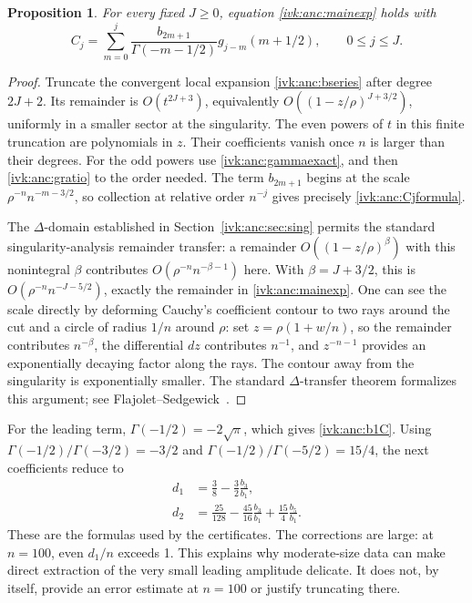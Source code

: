 \documentclass[11pt,letterpaper]{article}
\newtheorem{proposition}[theorem]{Proposition}
\theoremstyle{remark}\newtheorem{remark}[theorem]{Remark}
\begin{document}
\begin{proposition}\label{ivk:anc:prop:transfer}
For every fixed $J\ge0$, equation \eqref{ivk:anc:mainexp} holds with
\begin{equation}\label{ivk:anc:Cjformula}
 C_j=\sum_{m=0}^j
 \frac{b_{2m+1}}{\Gamma(-m-1/2)}
                  g_{j-m}(m+1/2),\qquad 0\le j\le J.
\end{equation}
\end{proposition}
\begin{proof}
Truncate the convergent local expansion \eqref{ivk:anc:bseries} after
degree $2J+2$. Its remainder is $O(t^{2J+3})$, equivalently
$O((1-z/\rho)^{J+3/2})$, uniformly in a smaller sector at the
singularity. The even powers of $t$ in this finite truncation
are polynomials in $z$. Their coefficients vanish once $n$ is
larger than their degrees. For the odd powers use
\eqref{ivk:anc:gammaexact}, and then \eqref{ivk:anc:gratio} to the order needed.
The term $b_{2m+1}$ begins at the scale
$\rho^{-n}n^{-m-3/2}$, so collection at relative order $n^{-j}$
gives precisely \eqref{ivk:anc:Cjformula}.

The $\Delta$-domain established in Section~\ref{ivk:anc:sec:sing} permits
the standard singularity-analysis remainder transfer: a remainder
$O((1-z/\rho)^\beta)$ with this nonintegral $\beta$ contributes
$O(\rho^{-n}n^{-\beta-1})$ here. With
$\beta=J+3/2$, this is
$O(\rho^{-n}n^{-J-5/2})$, exactly the remainder in
\eqref{ivk:anc:mainexp}. One can see the scale directly by deforming
Cauchy's coefficient contour to two rays around the cut and a
circle of radius $1/n$ around $\rho$: set
$z=\rho(1+w/n)$, so the remainder contributes $n^{-\beta}$,
the differential $dz$ contributes $n^{-1}$, and
$z^{-n-1}$ provides an exponentially decaying factor along the
rays. The contour away from the singularity is exponentially
smaller. The standard $\Delta$-transfer theorem formalizes this
argument; see Flajolet--Sedgewick~\cite[Chapter VI]{fs}.
\end{proof}

For the leading term,
$\Gamma(-1/2)=-2\sqrt\pi$, which gives \eqref{ivk:anc:b1C}.
Using $\Gamma(-1/2)/\Gamma(-3/2)=-3/2$ and
$\Gamma(-1/2)/\Gamma(-5/2)=15/4$, the next coefficients reduce to
\begin{align}
 d_1&=\frac38-\frac32\frac{b_3}{b_1},\label{ivk:anc:d1formula}\\
 d_2&=\frac{25}{128}-\frac{45}{16}\frac{b_3}{b_1}
                                  +\frac{15}{4}\frac{b_5}{b_1}.
                                                        \label{ivk:anc:d2formula}
\end{align}
These are the formulas used by the certificates. The corrections
are large: at $n=100$, even $d_1/n$ exceeds 1. This explains why
moderate-size data can make direct extraction of the very small
leading amplitude delicate. It does not, by itself, provide an
error estimate at $n=100$ or justify truncating there.
\end{document}
